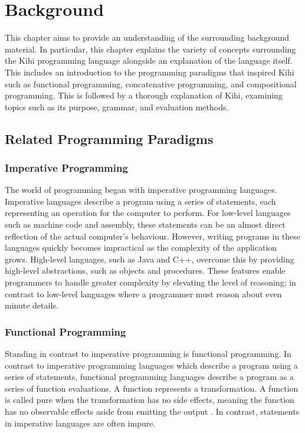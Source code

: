 \chapter{Background} \label{C:background}
This chapter aims to provide an understanding of the surrounding background material. In particular, this chapter explains the variety of concepts surrounding the Kihi programming language alongside an explanation of the language itself. This includes an introduction to the programming paradigms that inspired Kihi such as functional programming, concatenative programming, and compositional programming. This is followed by a thorough explanation of Kihi, examining topics such as its purpose, grammar, and evaluation methods.

\section{Related Programming Paradigms}
\subsection*{Imperative Programming}
The world of programming began with imperative programming languages. Imperative languages describe a program using a series of statements, each representing an operation for the computer to perform. For low-level languages such as machine code and assembly, these statements can be an almost direct reflection of the actual computer's behaviour. However, writing programs in these languages quickly becomes impractical as the complexity of the application grows. High-level languages, such as Java and C++, overcome this by providing high-level abstractions, such as objects and procedures. These features enable programmers to handle greater complexity by elevating the level of reasoning; in contrast to low-level languages where a programmer must reason about even minute details.


\subsection*{Functional Programming}

Standing in contrast to imperative programming is functional programming. In contrast to imperative programming languages which describe a program using a series of statements, functional programming languages describe a program as a series of function evaluations. A function represents a transformation. A function is called pure when the transformation has no side effects, meaning the function has no observable effects aside from emitting the output \cite{FunctionalProgrammingHaskellWiki2019}. In contrast, statements in imperative languages are often impure.

